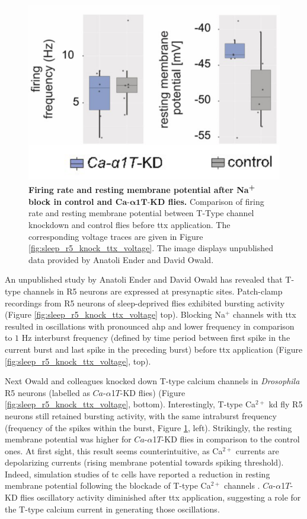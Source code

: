 \documentclass[../main.tex]{subfiles}
\begin{document}
\begin{figure}[!t]
    \centering
    \includegraphics[width=0.5\linewidth]{../img/sleep_and_r5_network/CaaT_knock_and_ttx/frequencies_whole.png}
    \caption[Firing rate and resting membrane potential after Na$^+$\textsuperscript{+} block in control and $Ca\text{-}\alpha1T\text{-KD}$ flies]{
        \textbf{Firing rate and resting membrane potential after Na\textsuperscript{+} block in control and $\bm{Ca\text{-}\alpha1T\text{-KD}}$ flies.}
        Comparison of firing rate and resting membrane potential between T-Type channel knockdown and control flies before \gls{ttx} application. The corresponding voltage traces are given in Figure \ref{fig:sleep_r5_knock_ttx_voltage}.
        The image displays unpublished data provided by Anatoli Ender and David Owald.
    }
    \label{fig:sleep_r5_knock_ttx_frequencies}
\end{figure}

An unpublished study by Anatoli Ender and David Owald has revealed that T-type channels in R5 neurons are expressed at presynaptic sites.
Patch-clamp recordings from R5 neurons of sleep-deprived flies exhibited bursting activity (Figure \ref{fig:sleep_r5_knock_ttx_voltage} top). Blocking Na$^+$ channels with \gls{ttx} resulted in oscillations with pronounced \gls{ahp} and lower frequency in comparison to $1$ Hz interburst frequency (defined by time period between first spike in the current burst and last spike in the preceding burst) before \gls{ttx} application (Figure \ref{fig:sleep_r5_knock_ttx_voltage}, top).

Next Owald and colleagues knocked down T-type calcium channels in \textit{Drosophila} R5 neurons (labelled as $Ca$-$\alpha$1$T$-KD flies) (Figure \ref{fig:sleep_r5_knock_ttx_voltage}, bottom). Interestingly, T-type Ca$^{2+}$ \gls{kd} fly R5 neurons still retained bursting activity, with the same intraburst frequency (frequency of the spikes within the burst, Figure \ref{fig:sleep_r5_knock_ttx_frequencies}, left). Strikingly, the resting membrane potential was higher for $Ca$-$\alpha$1$T$-KD flies in comparison to the control ones. At first sight, this result seems counterintuitive, as Ca$^{2+}$ currents are depolarizing currents (rising membrane potential towards spiking threshold). Indeed, simulation studies of \gls{tc} cells have reported a reduction in resting membrane potential following the blockade of T-type Ca$^{2+}$ channels \parencite{amarilloInterplaySevenSubthreshold2014}.
$Ca$-$\alpha$1$T$-KD flies oscillatory activity diminished after \gls{ttx} application, suggesting a role for the T-type calcium current in generating those oscillations.
\end{document}
